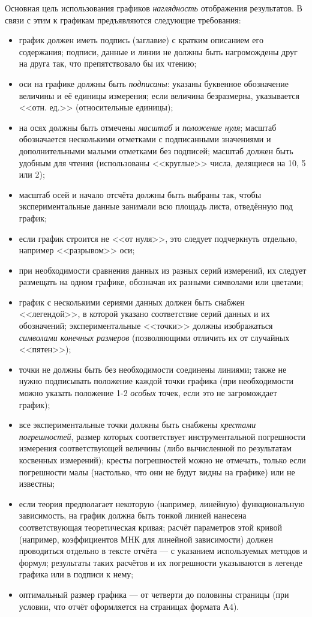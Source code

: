 Основная цель использования графиков \textendash{}
\emph{наглядность} отображения результатов. В связи с этим к графикам
предъявляются следующие требования:
\begin{itemize}
    \item график должен иметь подпись (заглавие) с кратким описанием его содержания;
подписи, данные и линии не должны быть нагромождены друг на друга
так, что препятствовало бы их чтению;
    \item оси на графике должны быть \emph{подписаны}: указаны буквенное обозначение
величины и её единицы измерения; если величина безразмерна, указывается
<<отн. ед.>> (относительные единицы); 
    \item на осях должны быть отмечены \emph{масштаб} и \emph{положение нуля};
масштаб обозначается несколькими отметками с подписанными значениями
и дополнительными малыми отметками без подписей; масштаб должен быть
удобным для чтения (использованы <<круглые>>
числа, делящиеся на 10, 5 или 2);
    \item масштаб осей и начало отсчёта должны быть выбраны так, чтобы экспериментальные
данные занимали всю площадь листа, отведённую под график;
    \item если график строится не <<от нуля>>, это
следует подчеркнуть отдельно, например <<разрывом>>
оси; 
    \item при необходимости сравнения данных из разных серий измерений, их следует
размещать на одном графике, обозначая их разными символами или цветами; 
    \item график с несколькими сериями данных должен быть снабжен <<легендой>>,
в которой указано соответствие серий данных и их обозначений; экспериментальные
<<точки>> должны изображаться \emph{символами
конечных размеров} (позволяющими отличить их от случайных <<пятен>>); 
    \item точки не должны быть без необходимости соединены линиями; также не
нужно подписывать положение каждой точки графика (при необходимости
можно указать положение 1-2 \emph{особых} точек, если это не загромождает
график);
    \item все экспериментальные точки должны быть снабжены \emph{крестами погрешностей},
размер которых соответствует инструментальной погрешности измерения
соответствующей величины (либо вычисленной по результатам косвенных
измерений); кресты погрешностей можно не отмечать, только если погрешности
малы (настолько, что они не будут видны на графике) или не известны; 
    \item если теория предполагает некоторую (например, линейную) функциональную
зависимость, на график должна быть тонкой линией нанесена соответствующая
теоретическая кривая; расчёт параметров этой кривой (например, коэффициентов
МНК для линейной зависимости) должен проводиться отдельно в тексте
отчёта --- с указанием используемых методов и формул; результаты
таких расчётов и их погрешности указываются в легенде графика или
в подписи к нему;
    \item оптимальный размер графика --- от четверти до половины страницы
(при условии, что отчёт оформляется на страницах формата А4).
\end{itemize}


